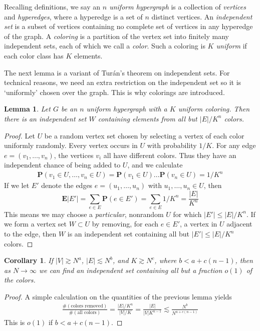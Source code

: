\documentclass{article}
\theoremstyle{plain}
\newtheorem{lemma}{Lemma}
\newtheorem*{corollary}{Corollary}
\theoremstyle{plain}
\begin{document}
\begin{multicols}{2}
Recalling definitions, we say an {\it $n$ uniform hypergraph} is a collection of {\it vertices} and {\it hyperedges}, where a hyperedge is a set of $n$ distinct vertices. An {\it independent set} is a subset of vertices containing no complete set of vertices in any hyperedge of the graph. A {\it coloring} is a partition of the vertex set into finitely many independent sets, each of which we call a {\it color}. Such a coloring is {\it $K$ uniform} if each color class has $K$ elements.

The next lemma is a variant of Tur\'{a}n's theorem on independent sets. For technical reasons, we need an extra restriction on the independent set so it is `uniformly' chosen over the graph. This is why colorings are introduced.

\begin{lemma}
	Let $G$ be an $n$ uniform hypergraph with a $K$ uniform coloring. Then there is an independent set $W$ containing elements from all but $|E|/K^n$ colors.
\end{lemma}
\begin{proof}
	Let $U$ be a random vertex set chosen by selecting a vertex of each color uniformly randomly. Every vertex occurs in $U$ with probability $1/K$. For any edge $e = (v_1, \dots, v_n)$, the vertices $v_i$ all have different colors. Thus they have an independent chance of being added to $U$, and we calculate
	\begin{align*}
		\mathbf{P}(v_1 \in U, \dots, v_n \in U) = \mathbf{P}(v_1 \in U) \dots \mathbf{P}(v_n \in U) = 1/K^n
	\end{align*}
	If we let $E'$ denote the edges $e = (u_1, \dots, u_n)$ with $u_1, \dots, u_n \in U$, then
	\[ \mathbf{E}|E'| = \sum_{e \in E} \mathbf{P}(e \in E') = \sum_{e \in E} 1/K^n = \frac{|E|}{K^n} \]
	This means we may choose a {\it particular}, nonrandom $U$ for which $|E'| \leq |E|/K^n$. If we form a vertex set $W \subset U$ by removing, for each $e \in E'$, a vertex in $U$ adjacent to the edge, then $W$ is an independent set containing all but $|E'| \leq |E|/K^n$ colors.
\end{proof}

\begin{corollary}
	If $|V| \gtrsim N^a$, $|E| \lesssim N^b$, and $K \gtrsim N^c$, where $b < a + c(n-1)$, then as $N \to \infty$ we can find an independent set containing all but a fraction $o(1)$ of the colors.
\end{corollary}
\begin{proof}
	A simple calculation on the quantities of the previous lemma yields
	\begin{align*}
		\frac{\# ( \text{colors removed} )}{\# ( \text{all colors} )} = \frac{|E|/K^n}{|V|/K} = \frac{|E|}{|V|K^{n-1}} \lesssim \frac{N^b}{N^{a + c(n-1)}}
	\end{align*}
	This is $o(1)$ if $b < a + c(n-1)$.
\end{proof}


\end{multicols}
\end{document}
